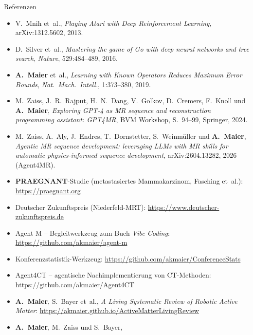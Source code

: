 \documentclass[final]{beamer}
\begin{document}
\begin{frame}[t]{Referenzen}
\vspace*{-0.8em}
\scriptsize
\linespread{0.88}\selectfont
\begin{itemize}\itemsep=-0.05em
  \item V.~Mnih et~al.,
        \emph{Playing Atari with Deep Reinforcement Learning},
        arXiv:1312.5602, 2013.
  \item D.~Silver et~al.,
        \emph{Mastering the game of Go with deep neural networks and tree search},
        \emph{Nature}, 529:484--489, 2016.
  \item \textbf{A.~Maier} et~al.,
        \emph{Learning with Known Operators Reduces Maximum Error Bounds},
        \emph{Nat.\ Mach.\ Intell.}, 1:373--380, 2019.
  \item M.~Zaiss, J.~R.~Rajput, H.~N.~Dang, V.~Golkov, D.~Cremers,
        F.~Knoll und \textbf{A.~Maier},
        \emph{Exploring GPT-4 as MR sequence and reconstruction programming
        assistant: GPT4MR},
        BVM Workshop, S.~94--99, Springer, 2024.
  \item M.~Zaiss, A.~Aly, J.~Endres, T.~Dornstetter, S.~Weinmüller und
        \textbf{A.~Maier},
        \emph{Agentic MR sequence development: leveraging LLMs with MR skills
        for automatic physics-informed sequence development},
        arXiv:2604.13282, 2026 (Agent4MR).
  \item \textbf{PRAEGNANT}-Studie (metastasiertes Mammakarzinom,
        Fasching et~al.): \url{https://praegnant.org}
  \item Deutscher Zukunftspreis (Niederfeld-MRT):
        \url{https://www.deutscher-zukunftspreis.de}
  \item Agent M -- Begleitwerkzeug zum Buch \emph{Vibe Coding}:
        \url{https://github.com/akmaier/agent-m}
  \item Konferenzstatistik-Werkzeug:
        \url{https://github.com/akmaier/ConferenceStats}
  \item Agent4CT -- agentische Nachimplementierung von CT-Methoden:
        \url{https://github.com/akmaier/Agent4CT}
  \item \textbf{A.~Maier}, S.~Bayer et~al.,
        \emph{A Living Systematic Review of Robotic Active Matter}:
        \url{https://akmaier.github.io/ActiveMatterLivingReview}
  \item \textbf{A.~Maier}, M.~Zaiss und S.~Bayer,

\end{itemize}
\end{frame}
\end{document}
